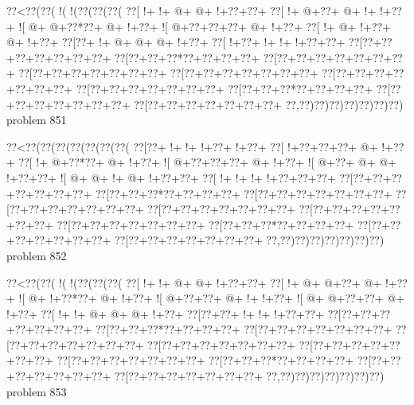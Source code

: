 \vbox{\vbox{\goo
\0??<\0??(\0??(\- !(\- !(\0??(\0??(\0??(
\0??[\- !+\- !+\- @+\- @+\- !+\0??+\0??+
\0??[\- !+\- @+\0??+\- @+\- !+\- !+\0??+
\- ![\- @+\- @+\0??*\0??+\- @+\- !+\0??+
\- ![\- @+\0??+\0??+\0??+\- @+\- !+\0??+
\0??[\- !+\- @+\- !+\0??+\- @+\- !+\0??+
\0??[\0??+\- !+\- @+\- @+\- @+\- !+\0??+
\0??[\- !+\0??+\- !+\- !+\- !+\0??+\0??+
\0??[\0??+\0??+\0??+\0??+\0??+\0??+\0??+
\0??[\0??+\0??+\0??*\0??+\0??+\0??+\0??+
\0??[\0??+\0??+\0??+\0??+\0??+\0??+\0??+
\0??[\0??+\0??+\0??+\0??+\0??+\0??+\0??+
\0??[\0??+\0??+\0??+\0??+\0??+\0??+\0??+
\0??[\0??+\0??+\0??+\0??+\0??+\0??+\0??+
\0??[\0??+\0??+\0??+\0??+\0??+\0??+\0??+
\0??[\0??+\0??+\0??*\0??+\0??+\0??+\0??+
\0??[\0??+\0??+\0??+\0??+\0??+\0??+\0??+
\0??[\0??+\0??+\0??+\0??+\0??+\0??+\0??+
\0??,\0??)\0??)\0??)\0??)\0??)\0??)\0??)
}
\hfil problem 851\hfil\break
}

\vbox{\vbox{\goo
\0??<\0??(\0??(\0??(\0??(\0??(\0??(\0??(
\0??[\0??+\- !+\- !+\- !+\0??+\- !+\0??+
\0??[\- !+\0??+\0??+\0??+\- @+\- !+\0??+
\0??[\- !+\- @+\0??*\0??+\- @+\- !+\0??+
\- ![\- @+\0??+\0??+\0??+\- @+\- !+\0??+
\- ![\- @+\0??+\- @+\- @+\- !+\0??+\0??+
\- ![\- @+\- @+\- !+\- @+\- !+\0??+\0??+
\0??[\- !+\- !+\- !+\- !+\0??+\0??+\0??+
\0??[\0??+\0??+\0??+\0??+\0??+\0??+\0??+
\0??[\0??+\0??+\0??*\0??+\0??+\0??+\0??+
\0??[\0??+\0??+\0??+\0??+\0??+\0??+\0??+
\0??[\0??+\0??+\0??+\0??+\0??+\0??+\0??+
\0??[\0??+\0??+\0??+\0??+\0??+\0??+\0??+
\0??[\0??+\0??+\0??+\0??+\0??+\0??+\0??+
\0??[\0??+\0??+\0??+\0??+\0??+\0??+\0??+
\0??[\0??+\0??+\0??*\0??+\0??+\0??+\0??+
\0??[\0??+\0??+\0??+\0??+\0??+\0??+\0??+
\0??[\0??+\0??+\0??+\0??+\0??+\0??+\0??+
\0??,\0??)\0??)\0??)\0??)\0??)\0??)\0??)
}
\hfil problem 852\hfil\break
}

\vbox{\vbox{\goo
\0??<\0??(\0??(\- !(\- !(\0??(\0??(\0??(
\0??[\- !+\- !+\- @+\- @+\- !+\0??+\0??+
\0??[\- !+\- @+\- @+\0??+\- @+\- !+\0??+
\- ![\- @+\- !+\0??*\0??+\- @+\- !+\0??+
\- ![\- @+\0??+\0??+\- @+\- !+\- !+\0??+
\- ![\- @+\- @+\0??+\0??+\- @+\- !+\0??+
\0??[\- !+\- !+\- @+\- @+\- @+\- !+\0??+
\0??[\0??+\0??+\- !+\- !+\- !+\0??+\0??+
\0??[\0??+\0??+\0??+\0??+\0??+\0??+\0??+
\0??[\0??+\0??+\0??*\0??+\0??+\0??+\0??+
\0??[\0??+\0??+\0??+\0??+\0??+\0??+\0??+
\0??[\0??+\0??+\0??+\0??+\0??+\0??+\0??+
\0??[\0??+\0??+\0??+\0??+\0??+\0??+\0??+
\0??[\0??+\0??+\0??+\0??+\0??+\0??+\0??+
\0??[\0??+\0??+\0??+\0??+\0??+\0??+\0??+
\0??[\0??+\0??+\0??*\0??+\0??+\0??+\0??+
\0??[\0??+\0??+\0??+\0??+\0??+\0??+\0??+
\0??[\0??+\0??+\0??+\0??+\0??+\0??+\0??+
\0??,\0??)\0??)\0??)\0??)\0??)\0??)\0??)
}
\hfil problem 853\hfil\break
}

